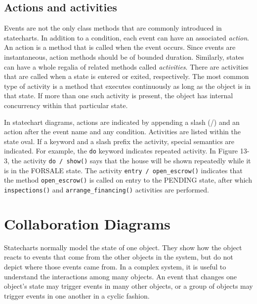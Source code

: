 \subsection{Actions and activities}

Events are not the only class methods that are commonly introduced in
statecharts. In addition to a condition, each event can have an
associated \textit{action}. An action is a
method that is called when the event occurs. Since events are
instantaneous, action methods should be of bounded duration.
Similarly, states can have a whole regalia of related methods called
\textit{activities}. There are activities
that are called when a state is entered or exited, respectively. The
most common type of activity is a method that executes continuously as
long as the object is in that state. If more than one such activity is
present, the object has internal concurrency within that particular
state.

In statechart diagrams, actions are indicated by appending a slash (/)
and an action after the event name and any
condition. Activities are listed within the state
oval. If a keyword and a slash prefix the activity, special semantics
are indicated. For example, the \texttt{do} keyword indicates
repeated activity. In Figure 13-3, the activity
\texttt{do / show()} says that the house will be shown repeatedly
while it is in the FORSALE state. The activity \texttt{entry /
open\_escrow()} indicates that the method \texttt{open\_escrow()} is
called on entry to the PENDING state, after which
\texttt{inspections()} and \texttt{arrange\_financing()} activities are
performed.

\section{Collaboration Diagrams}

Statecharts normally model the state of one
object. They show how the object reacts to events that come from the
other objects in the system, but do not depict where those events came
from. In a complex system, it is useful to understand
the interactions among many objects. An event that changes one
object's state may trigger events in many other
objects, or a group of objects may trigger events in one another in a
cyclic fashion.

